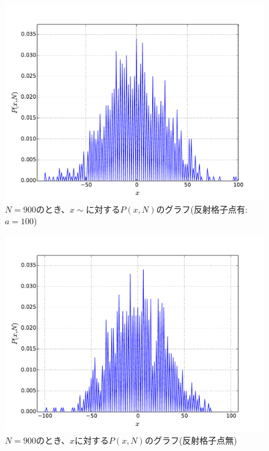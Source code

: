 \documentclass{jsarticle}
\begin{document}
\begin{enumerate}
\begin{enumerate}
                    \begin{figure}[H]
                        \begin{center}
                        \includegraphics[width=12.5cm]{figure_1.pdf}
                        \caption{$N=900$のとき、$x\sim$に対する$P(x,N)$のグラフ(反射格子点有:$a=100$)}
                        \label{fig:3}
                    \end{center}
                    \end{figure}


                    \begin{figure}[H]
                        \begin{center}
                        \includegraphics[width=12.5cm]{figure_4.pdf}
                        \caption{$N=900$のとき、$x$に対する$P(x,N)$のグラフ(反射格子点無)}
                        \label{fig:4}
                    \end{center}
                    \end{figure}



\end{enumerate}
\end{enumerate}
\end{document}
